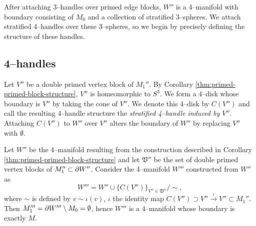 After attaching 3--handles over primed edge blocks, $W''$ is a 4--manifold with boundary consisting of $M_0$ and a collection of stratified 3--spheres.
We attach stratified 4--handles over these 3--spheres, so we begin by precisely defining the structure of these handles.

\subsection{4--handles}
Let $V''$ be a double primed vertex block of $M_1''$.
By Corollary \ref{thm:primed-primed-block-structure}, $V''$ is homeomorphic to $S^3$.
We form a 4--disk whose boundary is $V''$ by taking the cone of $V''$.
We denote this 4--disk by $C(V'')$ and call the resulting 4--handle structure the \emph{stratified 4--handle induced by $V''$}.
Attaching $C(V'')$ to $W''$ over $V''$ alters the boundary of $W''$ by replacing $V''$ with $\emptyset$.

\begin{cor}
	Let $W''$ be the 4--manifold resulting from the construction described in Corollary \ref{thm:primed-primed-block-structure} and let $\mathfrak{V}''$ be the set of double primed vertex blocks of $M_1''\subset\partial W''$.
	Consider the 4--manifold $W'''$ constructed from $W''$ as
	\[
	W''' = W''\cup\{C(V'')\}_{V''\in \mathfrak{V}''} / \sim,
	\]
	where $\sim$ is defined by $v\sim \iota(v)$, $\iota$ the identity map $C(V'')\supset V''\overset{\iota}{\to} V''\subset M_1''$.
	Then $M_1'''=\partial W'''\setminus M_0=\emptyset$, hence $W'''$ is a 4--manifold whose boundary is exactly $M$.
\end{cor}


